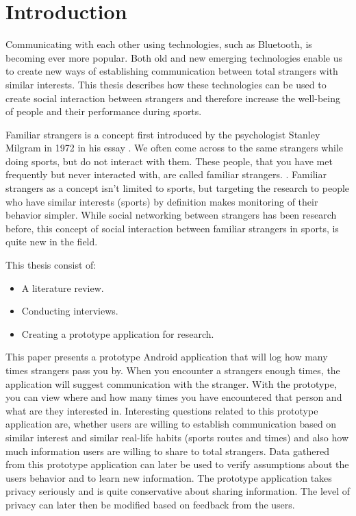 
\section{Introduction}

Communicating with each other using technologies, such as Bluetooth, is becoming ever more popular. Both old and new emerging technologies enable us to create new ways of establishing communication between total strangers with similar interests. This thesis describes how these technologies can be used to create social interaction between strangers and therefore increase the well-being of people and their performance during sports.

Familiar strangers is a concept first introduced by the psychologist Stanley Milgram in 1972 in his essay \citep{milgram1992}. We often come across to the same strangers while doing sports, but do not interact with them. These people, that you have met frequently but never interacted with, are called familiar strangers. \citep{familiarStranger}. Familiar strangers as a concept isn't limited to sports, but targeting the research to people who have similar interests (sports) by definition makes monitoring of their behavior simpler. While social networking between strangers has been research before, this concept of social interaction between familiar strangers in sports, is quite new in the field.

This thesis consist of:
\begin{itemize}
\item A literature review.
\item Conducting interviews.
\item Creating a prototype application for research.
\end{itemize}

This paper presents a prototype Android application that will log how many times strangers pass you by. When you encounter a strangers enough times, the application will suggest communication with the stranger. With the prototype, you can view where and how many times you have encountered that person and what are they interested in. Interesting questions related to this prototype application are, whether users are willing to establish communication based on similar interest and similar real-life habits (sports routes and times) and also how much information users are willing to share to total strangers. Data gathered from this prototype application can later be used to verify assumptions about the users behavior and to learn new information. The prototype application takes privacy seriously and is quite conservative about sharing information. The level of privacy can later then be modified based on feedback from the users.

